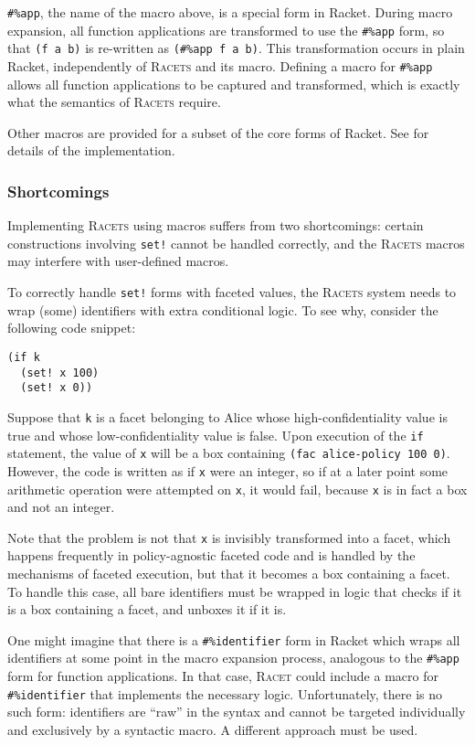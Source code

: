 \documentclass{article}
\begin{document}
\texttt{\#\%app}, the name of the macro above, is a special form in Racket. During macro expansion, all function applications are transformed to use the \texttt{\#\%app} form, so that \texttt{(f a b)} is re-written as \texttt{(\#\%app f a b)}. This transformation occurs in plain Racket, independently of \textsc{Racets} and its macro. Defining a macro for \texttt{\#\%app} allows all function applications to be captured and transformed, which is exactly what the semantics of \textsc{Racets} require.

Other macros are provided for a subset of the core forms of Racket. See \cite{racets} for details of the implementation.


\subsubsection{Shortcomings\label{sec:shortcomings}}
Implementing \textsc{Racets} using macros suffers from two shortcomings: certain constructions involving \texttt{set!} cannot be handled correctly, and the \textsc{Racets} macros may interfere with user-defined macros.

To correctly handle \texttt{set!} forms with faceted values, the \textsc{Racets} system needs to wrap (some) identifiers with extra conditional logic. To see why, consider the following code snippet:

\begin{lstlisting}
(if k
  (set! x 100)
  (set! x 0))
\end{lstlisting}

Suppose that \texttt{k} is a facet belonging to Alice whose high-confidentiality value is true and whose low-confidentiality value is false. Upon execution of the \texttt{if} statement, the value of \texttt{x} will be a box containing \texttt{(fac alice-policy 100 0)}. However, the code is written as if \texttt{x} were an integer, so if at a later point some arithmetic operation were attempted on \texttt{x}, it would fail, because \texttt{x} is in fact a box and not an integer.

Note that the problem is not that \texttt{x} is invisibly transformed into a facet, which happens frequently in policy-agnostic faceted code and is handled by the mechanisms of faceted execution, but that it becomes a box containing a facet. To handle this case, all bare identifiers must be wrapped in logic that checks if it is a box containing a facet, and unboxes it if it is.

One might imagine that there is a \texttt{\#\%identifier} form in Racket which wraps all identifiers at some point in the macro expansion process, analogous to the \texttt{\#\%app} form for function applications. In that case, \textsc{Racet} could include a macro for \texttt{\#\%identifier} that implements the necessary logic. Unfortunately, there is no such form: identifiers are ``raw'' in the syntax and cannot be targeted individually and exclusively by a syntactic macro. A different approach must be used.
\end{document}
